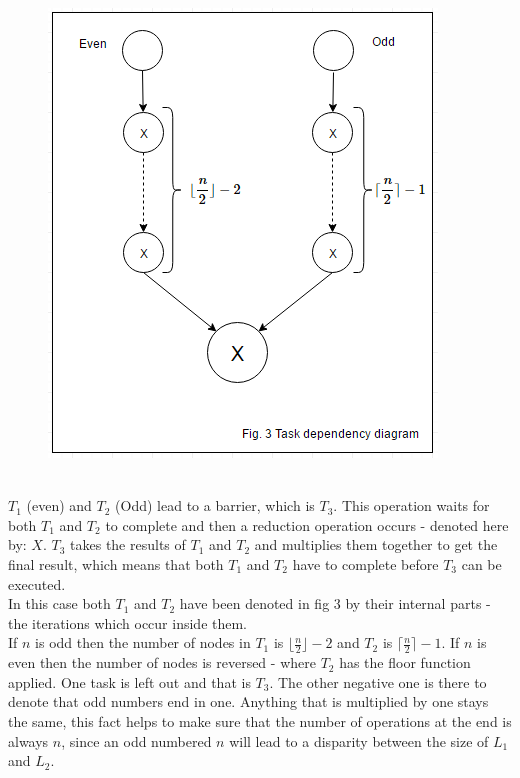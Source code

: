 \documentclass[11pt]{article}
\begin{document}
\begin{page}
\begin{figure}[ht]
\centering
     \includegraphics[scale=1]{parallel_fig_3}
\end{figure} \\

\noindent $T_1$ (even) and $T_2$ (Odd) lead to a barrier, which is $T_3$. This operation waits for both $T_1$ and $T_2$ to complete and then a reduction operation occurs - denoted here by: $X$. $T_3$ takes the results of $T_1$ and $T_2$ and multiplies them together to get the final result, which means that both $T_1$ and $T_2$ have to complete before $T_3$ can be executed.\\

\noindent In this case both $T_1$ and $T_2$ have been denoted in fig 3 by their internal parts - the iterations which occur inside them. \\

\noindent If $n$ is odd then the number of nodes in $T_1$ is $\lfloor{\frac{n}{2}}\rfloor - 2$ and $T_2$ is $\lceil{\frac{n}{2}}\rceil - 1$. If $n$ is even then the number of nodes is reversed - where $T_2$ has the floor function applied. One task is left out and that is $T_3$. The other negative one is there to denote that odd numbers end in one. Anything that is multiplied by one stays the same, this fact helps to make sure that the number of operations at the end is always $n$, since an odd numbered $n$ will lead to a disparity between the size of $L_1$ and $L_2$.


\end{page}
\end{document}
